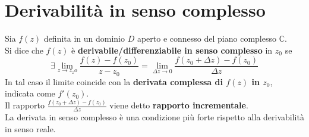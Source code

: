 \documentclass[twoside]{article}
\begin{document}
\newpage
\section{Derivabilità in senso complesso}
\begin{comment}
\begin{wrapfigure}[7]{L}{0.05\textwidth}
  \begin{center}
    \texttt{[image: Eulero.jpg]}
  \end{center}
\end{wrapfigure}\leavevmode

\vspace{1.5cm}

\epigraph{Ora avrò minore occasione di distrazione.}{\textit{Leonhard Euler,\\dopo aver perso la vista dall'occhio destro}}

\vspace{1.5cm}
\end{comment}

Sia $f(z)$ definita in un dominio $D$ aperto e connesso del piano complesso $\mathds{C}$.\\
Si dice che $f(z)$ è \textbf{derivabile/differenziabile in senso complesso} in $z_0$ se 
\begin{equation}
	\exists \lim\limits_{z\to z_zo}\frac{f(z)-f(z_0)}{z-z_0}=\lim\limits_{\Delta z\to 0}\frac{f(z_0+\Delta z)-f(z_0)}{\Delta z}
\end{equation}
In tal caso il limite coincide con la \textbf{derivata complessa di $f(z)$ in $z_0$}, indicata come $f'(z_0)$.\\
Il rapporto $\frac{f(z_0+\Delta z)-f(z_0)}{\Delta z}$ viene detto \textbf{rapporto incrementale}.\\
La derivata in senso complesso è una condizione più forte rispetto alla derivabilità in senso reale.\\
\end{document}
